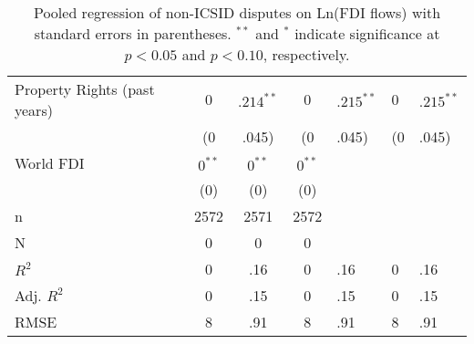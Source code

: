 \begin{table}[ht]
\begin{tabular}{lccc}
  Property Rights (past  years) & $0$&$.214^{\ast\ast}$ & $0$&$.215^{\ast\ast}$ & $0$&$.215^{\ast\ast}$ \\ 
   & (0&.045) & (0&.045) & (0&.045) \\ 
  World FDI & $0^{\ast\ast}$ & $0^{\ast\ast}$ & $0^{\ast\ast}$ \\ 
   & (0) & (0) & (0) \\ 
   \hline
n & 2572 & 2571 & 2572 \\ 
  N & 0 & 0 & 0 \\ 
  $R^{2}$ & 0&.16 & 0&.16 & 0&.16 \\ 
  Adj. $R^{2}$ & 0&.15 & 0&.15 & 0&.15 \\ 
  RMSE & 8&.91 & 8&.91 & 8&.91 \\ 
   \hline
\hline
\end{tabular}
\endgroup
\caption{Pooled regression of non-ICSID disputes on Ln(FDI flows) with standard errors in parentheses. $^{**}$ and $^{*}$ indicate significance at $p< 0.05 $ and $p< 0.10 $, respectively.} 
\end{table}
